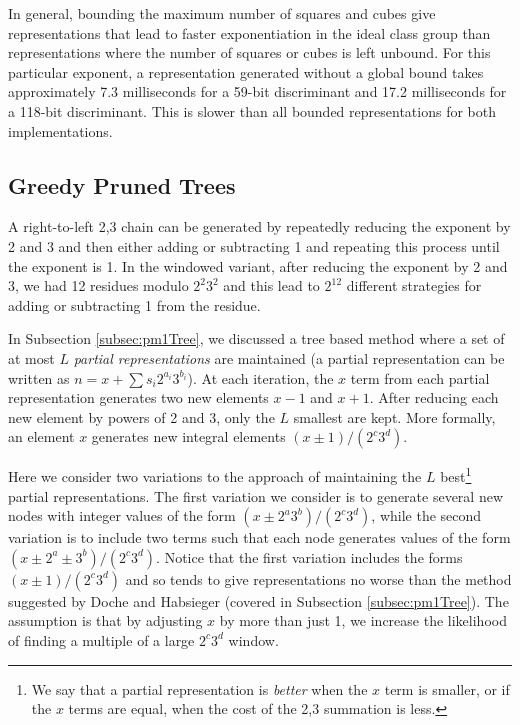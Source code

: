 \documentclass{ucalgthes1}
\theoremstyle{definition}
\begin{document}
In general, bounding the maximum number of squares and cubes give representations that lead to faster exponentiation in the ideal class group than representations where the number of squares or cubes is left unbound.  For this particular exponent, a representation generated without a global bound takes approximately 7.3 milliseconds for a 59-bit discriminant and 17.2 milliseconds for a 118-bit discriminant.  This is slower than all bounded representations for both implementations.

\subsection{Greedy Pruned Trees}

A right-to-left 2,3 chain can be generated by repeatedly reducing the exponent by 2 and 3 and then either adding or subtracting 1 and repeating this process until the exponent is 1.  In the windowed variant, after reducing the exponent by 2 and 3, we had 12 residues modulo $2^2 3^2$ and this lead to $2^{12}$ different strategies for adding or subtracting 1 from the residue.

In Subsection \ref{subsec:pm1Tree}, we discussed a tree based method where a set of at most $L$ \emph{partial representations} are maintained (a partial representation can be written as $n = x + \sum s_i2^{a_i}3^{b_i}$).  At each iteration, the $x$ term from each partial representation generates two new elements $x-1$ and $x+1$.  After reducing each new element by powers of 2 and 3, only the $L$ smallest are kept.  More formally, an element $x$ generates new integral elements $(x \pm 1)/(2^c3^d)$.

Here we consider two variations to the approach of maintaining the $L$ best\footnote{We say that a partial representation is \emph{better} when the $x$ term is smaller, or if the $x$ terms are equal, when the cost of the 2,3 summation is less.} partial representations. The first variation we consider is to generate several new nodes with integer values of the form $(x \pm 2^a3^b)/(2^c3^d)$, while the second variation is to include two terms such that each node generates values of the form $(x \pm 2^a \pm 3^b) / (2^c 3^d)$.  Notice that the first variation includes the forms $(x \pm 1)/(2^c 3^d)$ and so tends to give representations no worse than the method suggested by Doche and Habsieger \cite{Doche2008} (covered in Subsection \ref{subsec:pm1Tree}).  The assumption is that by adjusting $x$ by more than just 1, we increase the likelihood of finding a multiple of a large $2^c3^d$ window.
\end{document}
